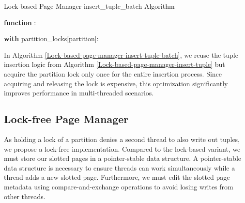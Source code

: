 \begin{algorithm}[h]
  \caption{Lock-based Page Manager insert\_tuple\_batch Algorithm}
  \label{Lock-based-page-manager-insert-tuple-batch}



  \textbf{function} :

  \textbf{with} partition\_locks[partition]:
\end{algorithm}

In Algorithm \ref{Lock-based-page-manager-insert-tuple-batch}, we reuse the tuple insertion logic from Algorithm \ref{Lock-based-page-manager-insert-tuple} but acquire the partition lock only once for the entire insertion process.
Since acquiring and releasing the lock is expensive, this optimization significantly improves performance in multi-threaded scenarios.

\subsection{Lock-free Page Manager}
As holding a lock of a partition denies a second thread to also write out tuples, we propose a lock-free implementation.
Compared to the lock-based variant, we must store our slotted pages in a pointer-stable data structure.
A pointer-stable data structure is necessary to ensure threads can work simultaneously while a thread adds a new slotted page.
Furthermore, we must edit the slotted page metadata using compare-and-exchange operations to avoid losing writes from other threads.

